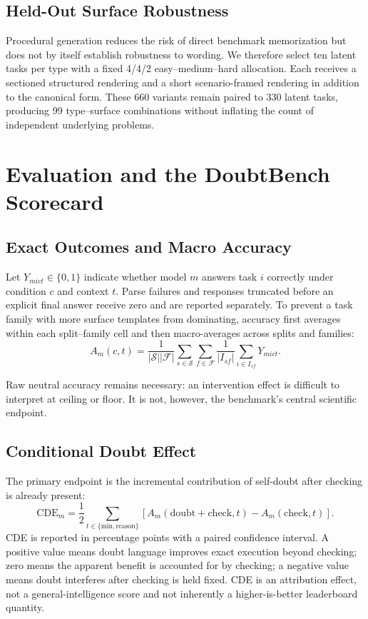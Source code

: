 \documentclass[sigconf]{acmart}
\newcommand{\revision}[1]{\textcolor{revisionred}{#1}}
\begin{document}
\subsection{Held-Out Surface Robustness}

\revision{Procedural generation reduces the risk of direct benchmark
memorization but does not by itself establish robustness to wording.} We
therefore select ten latent tasks
per type with a fixed 4/4/2 easy--medium--hard allocation. Each receives a
sectioned structured rendering and a short scenario-framed rendering in
addition to the canonical form. These 660 variants remain paired to 330 latent
tasks, producing 99 type--surface combinations without inflating the count of
independent underlying problems.

\section{Evaluation and the DoubtBench Scorecard}
\label{sec:score}

\subsection{Exact Outcomes and Macro Accuracy}

Let $Y_{mict}\in\{0,1\}$ indicate whether model $m$ answers task $i$
correctly under condition $c$ and context $t$. Parse failures and responses
truncated before an explicit final answer receive zero and are reported
separately. To prevent a task family with more surface templates from
dominating, accuracy first averages within each split--family cell and then
macro-averages across splits and families:
\begin{equation}
A_m(c,t)=\frac{1}{|\mathcal S||\mathcal F|}
\sum_{s\in\mathcal S}\sum_{f\in\mathcal F}
\frac{1}{|I_{sf}|}\sum_{i\in I_{sf}}Y_{mict}.
\label{eq:accuracy}
\end{equation}

Raw neutral accuracy remains necessary: an intervention effect is difficult to
interpret at ceiling or floor. It is not, however, the benchmark's central
scientific endpoint.

\subsection{Conditional Doubt Effect}

The primary endpoint is the incremental contribution of self-doubt after
checking is already present:
\begin{equation}
\mathrm{CDE}_m=\frac{1}{2}\sum_{t\in\{\mathrm{min},\mathrm{reason}\}}
\left[A_m(\mathrm{doubt{+}check},t)-A_m(\mathrm{check},t)\right].
\label{eq:cde}
\end{equation}
CDE is reported in percentage points with a paired confidence interval. A
positive value means doubt language improves exact execution beyond checking;
zero means the apparent benefit is accounted for by checking; a negative value
means doubt interferes after checking is held fixed. CDE is an attribution
effect, not a general-intelligence score and not inherently a
higher-is-better leaderboard quantity.
\end{document}
